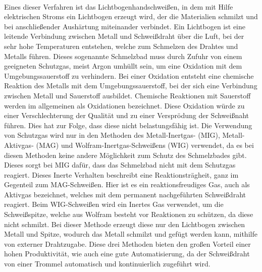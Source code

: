 \\Eines dieser Verfahren ist das 
Lichtbogenhandschweißen, in dem mit Hilfe elektrischen Stroms ein Lichtbogen erzeugt wird, der die Materialien schmilzt und bei anschließender Aushärtung 
miteinander verbindet. Ein Lichtbogen ist eine leitende Verbindung zwischen Metall und Schweißdraht über die Luft, bei der sehr hohe Temperaturen entstehen, 
welche zum Schmelzen des Drahtes und Metalls führen. Dieses sogenannte Schmelzbad muss durch Zufuhr von einem geeigneten Schutzgas, meist Argon umhüllt sein,
um eine Oxidation mit dem Umgebungssauerstoff zu verhindern. Bei einer Oxidation entsteht eine chemische Reaktion des Metalls mit dem Umgebungssauerstoff, 
bei der sich eine Verbindung zwischen Metall und Sauerstoff ausbildet. 
Chemische Reaktionen mit Sauerstoff werden im allgemeinen als Oxidationen bezeichnet.
Diese Oxidation würde zu einer Verschlechterung der Qualität und zu einer Versprödung der Schweißnaht führen. Dies hat zur Folge, dass diese nicht 
belastungsfähig ist.
Die Verwendung von Schutzgas wird nur in den Methoden des Metall-Inertgas- (MIG), Metall-Aktivgas- (MAG) und Wolfram-Inertgas-Schweißens (WIG) 
verwendet, da es bei diesen Methoden keine andere Möglichkeit zum Schutz des Schmelzbades gibt. Dieses sorgt bei MIG dafür, dass das Schmelzbad nicht mit dem 
Schutzgas reagiert. Dieses Inerte Verhalten beschreibt eine
Reaktionsträgheit, ganz im Gegenteil zum MAG-Schweißen. Hier ist es ein reaktionsfreudiges Gas, auch als Aktivgas bezeichnet, welches mit dem permanent 
nachgeführten Schweißdraht reagiert. 
Beim WIG-Schweißen wird ein Inertes Gas verwendet, um die Schweißspitze, welche aus Wolfram besteht vor Reaktionen zu
schützen, da diese nicht schmilzt. Bei dieser Methode erzeugt diese nur den Lichtbogen zwischen Metall und Spitze, wodurch das Metall schmilzt und gefügt 
werden kann, mithilfe von externer Drahtzugabe. Diese drei Methoden bieten den großen Vorteil einer hohen Produktivität, wie auch eine gute Automatisierung,
da der Schweißdraht von einer Trommel automatisch und kontinuierlich zugeführt wird. 
\clearpage

